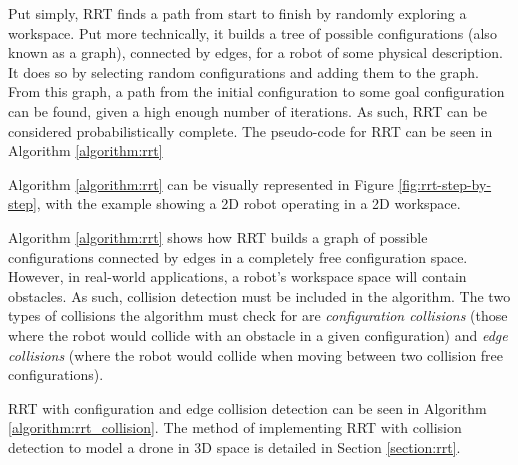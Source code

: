         Put simply, \gls{RRT} finds a path from start to finish by randomly exploring a workspace.
        Put more technically, it builds a tree of possible \glspl{configuration} (also known as a graph), connected by edges, for a robot of some physical description. It does so by selecting random \glspl{configuration} and adding them to the graph. 
        From this graph, a path from the initial \gls{configuration} to some goal \gls{configuration} can be found, given a high enough number of iterations. As such, \gls{RRT} can be considered \gls{probabilistically complete}.
        The pseudo-code for \gls{RRT} can be seen in Algorithm \ref{algorithm:rrt}
        
        

        Algorithm \ref{algorithm:rrt} can be visually represented in Figure \ref{fig:rrt-step-by-step}, with the example showing a \gls{2D} robot operating in a \gls{2D} workspace.

        


        Algorithm \ref{algorithm:rrt} shows how \gls{RRT} builds a graph of possible \gls{configuration}s connected by edges in a completely free \gls{configuration} space. However, in real-world applications, a robot's \gls{workspace} space will contain obstacles. As such, collision detection must be included in the algorithm. The two types of collisions the algorithm must check for are \textit{configuration collisions} (those where the robot would collide with an obstacle in a given \gls{configuration}) and \textit{edge collisions} (where the robot would collide when moving between two collision free \gls{configuration}s).

        \gls{RRT} with \gls{configuration} and edge collision detection can be seen in Algorithm \ref{algorithm:rrt_collision}. The method of implementing \gls{RRT} with collision detection to model a drone in 3D space is detailed in Section \ref{section:rrt}.

        

